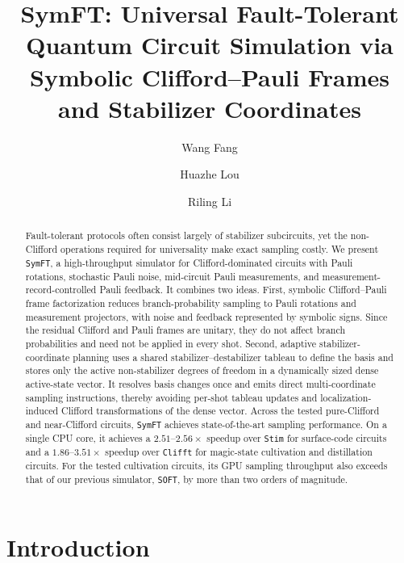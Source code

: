 \documentclass[a4paper,onecolumn,unpublished]{quantumarticle}
\newcommand{\tFont}[1]{\texttt{#1}}
\newcommand{\symft}{\tFont{SymFT}}
\newcommand{\soft}{\tFont{SOFT}}
\newcommand{\stim}{\tFont{Stim}}
\newcommand{\clifft}{\tFont{Clifft}}
\begin{document}
\title{SymFT: Universal Fault-Tolerant Quantum Circuit Simulation via Symbolic Clifford--Pauli Frames and Stabilizer Coordinates}

\author[1]{Wang Fang}
\author[2]{Huazhe Lou}
\author[3]{Riling Li}
 

\maketitle

\begin{abstract}
Fault-tolerant protocols often consist largely of stabilizer subcircuits, yet the non-Clifford operations required for universality make exact sampling costly.
We present \symft{}, a high-throughput simulator for Clifford-dominated circuits with Pauli rotations, stochastic Pauli noise, mid-circuit Pauli measurements, and measurement-record-controlled Pauli feedback.
It combines two ideas.
First, symbolic Clifford--Pauli frame factorization reduces branch-probability sampling to Pauli rotations and measurement projectors, with noise and feedback represented by symbolic signs.
Since the residual Clifford and Pauli frames are unitary, they do not affect branch probabilities and need not be applied in every shot.
Second, adaptive stabilizer-coordinate planning uses a shared stabilizer--destabilizer tableau to define the basis and stores only the active non-stabilizer degrees of freedom in a dynamically sized dense active-state vector.
It resolves basis changes once and emits direct multi-coordinate sampling instructions, thereby avoiding per-shot tableau updates and localization-induced Clifford transformations of the dense vector.
Across the tested pure-Clifford and near-Clifford circuits, \symft{} achieves state-of-the-art sampling performance.
On a single CPU core, it achieves a $2.51\text{--}2.56\times$ speedup over \stim{} for surface-code circuits and a $1.86\text{--}3.51\times$ speedup over \clifft{} for magic-state cultivation and distillation circuits.
For the tested cultivation circuits, its GPU sampling throughput also exceeds that of our previous simulator, \soft{}, by more than two orders of magnitude.
\end{abstract}

\section{Introduction}
\label{sec:intro}
\end{document}
